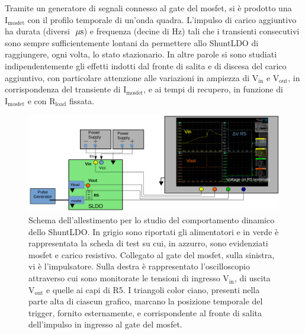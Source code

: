Tramite un generatore di segnali connesso al gate del mosfet, si \`e prodotto una $\mathrm{I_{mosfet}}$ con il profilo temporale di un'onda quadra. L'impulso di carico aggiuntivo ha durata (diversi $\; \mu \rm s$) e frequenza (decine di Hz) tali che i transienti consecutivi sono sempre sufficientemente lontani da permettere allo ShuntLDO di raggiungere, ogni volta, lo stato stazionario. In altre parole si sono studiati indipendentemente gli effetti indotti dal fronte di salita e di discesa del carico aggiuntivo, con particolare attenzione alle variazioni in ampiezza di $\mathrm{V_{in}}$ e $\mathrm{V_{out}}$, in corrispondenza del transiente di $\mathrm{I_{mosfet}}$, e ai tempi di recupero, in funzione di $\mathrm{I_{mosfet}}$ e con $\mathrm{R_{load}}$ fissata.
\begin{figure}[!htb]
\centering
\includegraphics[width=.99\linewidth]{Immagini/SetupScheme}
\caption{Schema dell'allestimento per lo studio del comportamento dinamico dello ShuntLDO. In grigio sono riportati gli alimentatori e in verde è rappresentata la scheda di test su cui, in azzurro, sono evidenziati mosfet e carico resistivo. Collegato al gate del mosfet, sulla sinistra, vi è l'impulsatore. Sulla destra è rappresentato l'oscilloscopio attraverso cui sono monitorate le tensioni di ingresso $\mathrm{V_{in}}$, di uscita $\mathrm{V_{out}}$ e quelle ai capi di R5. I triangoli color ciano, presenti nella parte alta di ciascun grafico, marcano la posizione temporale del trigger, fornito esternamente, e corrispondente al fronte di salita dell'impulso in ingresso al gate del mosfet.}
\label{Setupscheme}
\end{figure}

